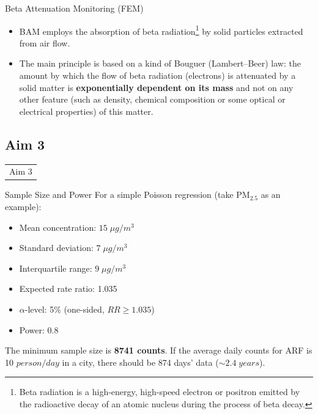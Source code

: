 \documentclass{beamer}
\begin{document}
\begin{frame}{Beta Attenuation Monitoring (FEM)}
    \begin{itemize}
        \item BAM employs the absorption of beta radiation\footnote{Beta radiation is a high-energy, high-speed electron or positron emitted by the radioactive decay of an atomic nucleus during the process of beta decay.} by solid particles extracted from air flow. 
        \item The main principle is based on a kind of Bouguer (Lambert–Beer) law: the amount by which the flow of beta radiation (electrons) is attenuated by a solid matter is \textbf{exponentially dependent on its mass} and not on any other feature (such as density, chemical composition or some optical or electrical properties) of this matter.
    \end{itemize}
    
   
\end{frame}


\subsection*{Aim 3}

\begin{frame}{}
    \begin{table}
        \LARGE
        \centering
        \begin{tabular}{c}
             \textcolor[rgb]{0.1,0.1,0.6}{Aim 3}
        \end{tabular}
    \end{table}
\end{frame}

\begin{frame}{Sample Size and Power}
    \label{frm:power}
    For a simple Poisson regression (take PM$_{2.5}$ as an example):
    \begin{itemize}
        \item Mean concentration: $15\;\mu g/m^3$
        \item Standard deviation: $7\;\mu g/m^3$
        \item Interquartile range: $9\;\mu g/m^3$
        \item Expected rate ratio: 1.035
        \item $\alpha$-level: 5\% (one-sided, $RR \geq 1.035$)
        \item Power: 0.8
    \end{itemize}
    The minimum sample size is \textbf{8741 counts}. If the average daily counts for ARF is 10 $person/day$ in a city, there should be 874 days' data ($\sim 2.4\;years$).
\end{frame}
\end{document}
